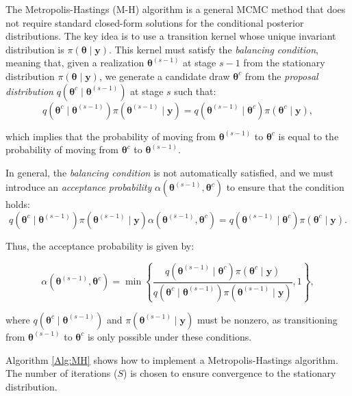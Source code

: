 The Metropolis-Hastings (M-H) algorithm \cite{metropolis53,hastings70} is a general MCMC method that does not require standard closed-form solutions for the conditional posterior distributions. The key idea is to use a transition kernel whose unique invariant distribution is $\pi(\bm{\theta} \mid  \bm{y})$. This kernel must satisfy the \textit{balancing condition}, meaning that, given a realization $\bm{\theta}^{(s-1)}$ at stage $s-1$ from the stationary distribution $\pi(\bm{\theta} \mid  \bm{y})$, we generate a candidate draw $\bm{\theta}^{c}$ from the \textit{proposal distribution} $q(\bm{\theta}^{c} \mid  \bm{\theta}^{(s-1)})$ at stage $s$ such that:
\[
q(\bm{\theta}^{c} \mid  \bm{\theta}^{(s-1)}) \pi(\bm{\theta}^{(s-1)} \mid  \bm{y}) = q(\bm{\theta}^{(s-1)} \mid  \bm{\theta}^{c}) \pi(\bm{\theta}^{c} \mid  \bm{y}),
\]

which implies that the probability of moving from $\bm{\theta}^{(s-1)}$ to $\bm{\theta}^{c}$ is equal to the probability of moving from $\bm{\theta}^{c}$ to $\bm{\theta}^{(s-1)}$.

In general, the \textit{balancing condition} is not automatically satisfied, and we must introduce an \textit{acceptance probability} $\alpha(\bm{\theta}^{(s-1)}, \bm{\theta}^{c})$ to ensure that the condition holds:
\[
q(\bm{\theta}^{c} \mid  \bm{\theta}^{(s-1)}) \pi(\bm{\theta}^{(s-1)} \mid  \bm{y}) \alpha(\bm{\theta}^{(s-1)}, \bm{\theta}^{c}) = q(\bm{\theta}^{(s-1)} \mid  \bm{\theta}^{c}) \pi(\bm{\theta}^{c} \mid  \bm{y}).
\]

Thus, the acceptance probability is given by:

\[
\alpha(\bm{\theta}^{(s-1)}, \bm{\theta}^{c}) = 
\min\left\{\frac{q(\bm{\theta}^{(s-1)} \mid  \bm{\theta}^{c}) \pi(\bm{\theta}^{c} \mid  \bm{y})}{q(\bm{\theta}^{c} \mid  \bm{\theta}^{(s-1)}) \pi(\bm{\theta}^{(s-1)} \mid  \bm{y})}, 1\right\},
\]

where $q(\bm{\theta}^{c} \mid  \bm{\theta}^{(s-1)})$ and $\pi(\bm{\theta}^{(s-1)} \mid  \bm{y})$ must be nonzero, as transitioning from $\bm{\theta}^{(s-1)}$ to $\bm{\theta}^{c}$ is only possible under these conditions.

Algorithm \ref{Alg:MH} shows how to implement a Metropolis-Hastings algorithm.  The number of iterations ($S$) is chosen to ensure convergence to the stationary distribution. 

